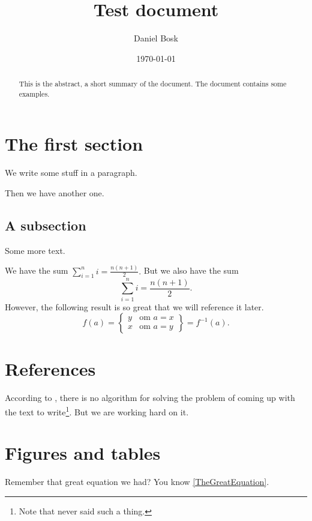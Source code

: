 \documentclass[a4paper]{article}
\author{Daniel Bosk}
\title{Test document}
\date{\today}
\begin{document}
\maketitle

\begin{abstract}
  This is the abstract, a short summary of the document.
  The document contains some examples.
\end{abstract}

\tableofcontents


\section{The first section}\label{sec:First}

We write some stuff in a paragraph.

Then we have another one.


\subsection{A subsection}\label{sub:Part}
Some more text.

We have the sum \(
  \sum_{i=1}^n i = \frac{n (n + 1)}{2}.
\) But we also have the sum \[
  \sum_{i=1}^n i = \frac{n (n + 1)}{2}.
\]
However, the following result is so great that we will reference it later.
\begin{equation}\label{TheGreatEquation}
  f(a) = \left\{
    \begin{array}{ll}
      y & \text{om } a=x \\
      x & \text{om } a=y
    \end{array}
  \right\} = f^{-1}(a).
\end{equation}


\section{References}\label{sec:Ref}

According to \textcite{Knuth1997tao}, there is no algorithm for solving the 
problem of coming up with the text to write\footnote{%
  Note that \citeauthor{Knuth1997tao} never said such a thing.
}.
But we are working hard on it.


\section{Figures and tables}\label{sec:FigTab}

Remember that great equation we had?
You know \cref{TheGreatEquation}.
\end{document}
